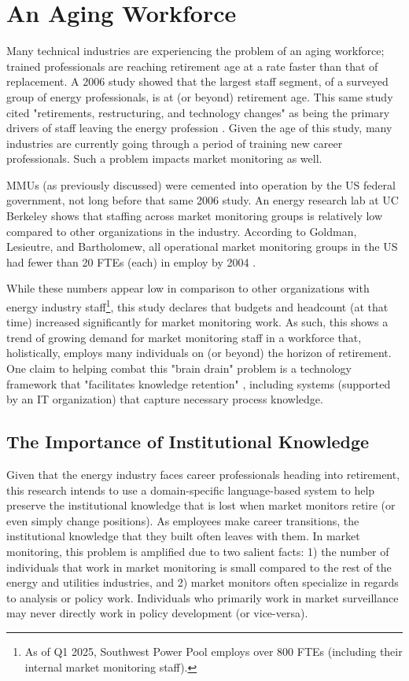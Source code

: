 \section{An Aging Workforce}

Many technical industries are experiencing the problem of an aging workforce; trained professionals are reaching retirement age at a rate faster than that of replacement. A 2006 study showed that the largest staff segment, of a surveyed group of energy professionals, is at (or beyond) retirement age. This same study cited "retirements, restructuring, and technology changes" as being the primary drivers of staff leaving the energy profession \cite{raysnyder}. Given the age of this study, many industries are currently going through a period of training new career professionals. Such a problem impacts market monitoring as well. 

MMUs (as previously discussed) were cemented into operation by the US federal government, not long before that same 2006 study. An energy research lab at UC Berkeley shows that staffing across market monitoring groups is relatively low compared to other organizations in the industry. According to Goldman, Lesieutre, and Bartholomew, all operational market monitoring groups in the US had fewer than 20 FTEs (each) in employ by 2004 \cite{goldman}.

While these numbers appear low in comparison to other organizations with energy industry staff\footnote{As of Q1 2025, Southwest Power Pool employs over 800 FTEs (including their internal market monitoring staff).}, this study declares that budgets and headcount (at that time) increased significantly for market monitoring work. As such, this shows a trend of growing demand for market monitoring staff in a workforce that, holistically, employs many individuals on (or beyond) the horizon of retirement. One claim to helping combat this "brain drain" problem is a technology framework that "facilitates knowledge retention" \cite{raysnyder}, including systems (supported by an IT organization) that capture necessary process knowledge.

\subsection{The Importance of Institutional Knowledge}

Given that the energy industry faces career professionals heading into retirement, this research intends to use a domain-specific language-based system to help preserve the institutional knowledge that is lost when market monitors retire (or even simply change positions). As employees make career transitions, the institutional knowledge that they built often leaves with them. In market monitoring, this problem is amplified due to two salient facts: 1) the number of individuals that work in market monitoring is small compared to the rest of the energy and utilities industries, and 2) market monitors often specialize in regards to analysis or policy work. Individuals who primarily work in market surveillance may never directly work in policy development (or vice-versa).

